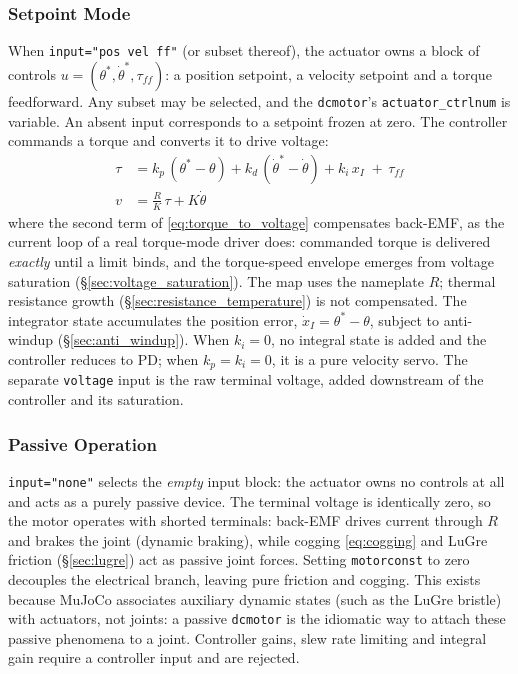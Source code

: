\documentclass[10pt, a4paper, twocolumn]{article}
\let\oldtexttt\texttt
\renewcommand{\texttt}[1]{{\smaller\oldtexttt{#1}}}
\begin{document}
\subsubsection{Setpoint Mode}
\label{sec:setpoint_mode}

When \texttt{input="pos vel ff"} (or subset thereof), the actuator owns a
block of controls $u = (\theta^*, \dot\theta^*, \tau_{f\!f})$: a position setpoint, a velocity
setpoint and a torque feedforward. Any subset may be selected, and the \texttt{dcmotor}'s \texttt{actuator\_ctrlnum} is variable.
An absent input corresponds to a setpoint frozen at
zero. The controller commands a torque and converts it to drive voltage:
\begin{align}
  \tau &= k_p \, (\theta^* - \theta) + k_d \, (\dot\theta^* - \dot\theta)
      + k_i \, x_I \; + \, \tau_{f\!f}
  \label{eq:setpoint_mode} \\
  v &= \frac{R}{K} \, \tau + K \dot\theta
  \label{eq:torque_to_voltage}
\end{align}
where the second term of \eqref{eq:torque_to_voltage} compensates back-EMF, as the
current loop of a real torque-mode driver does: commanded torque is delivered {\em
exactly} until a limit binds, and the torque-speed envelope emerges from voltage
saturation (\S\ref{sec:voltage_saturation}). The map uses the nameplate $R$; thermal
resistance growth (\S\ref{sec:resistance_temperature}) is not compensated. The
integrator state accumulates the position error, $\dot x_I = \theta^* - \theta$,
subject to anti-windup (\S\ref{sec:anti_windup}). When $k_i = 0$, no integral state
is added and the controller reduces to PD; when $k_p = k_i = 0$, it is a pure
velocity servo. The separate \texttt{voltage} input is the raw terminal voltage,
added downstream of the controller and its saturation.

\subsubsection{Passive Operation}
\label{sec:passive}

\texttt{input="none"} selects the {\em empty} input block: the actuator owns no
controls at all and acts as a purely passive device. The terminal voltage is
identically zero, so the motor operates with shorted terminals: back-EMF drives
current through $R$ and brakes the joint (dynamic braking), while cogging
\eqref{eq:cogging} and LuGre friction (\S\ref{sec:lugre}) act as passive joint
forces. Setting \texttt{motorconst} to zero decouples the electrical branch,
leaving pure friction and cogging. This exists because MuJoCo associates auxiliary
dynamic states (such as the LuGre bristle) with actuators, not joints: a passive
\texttt{dcmotor} is the idiomatic way to attach these passive phenomena to a joint.
Controller gains, slew rate limiting and integral gain require a controller input and are rejected.
\end{document}

